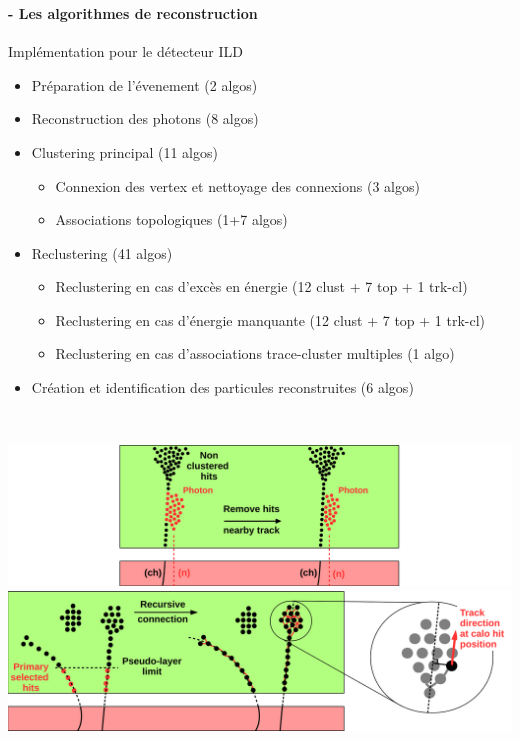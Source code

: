 \documentclass[8pt]{beamer}
\begin{document}
  \begin{frame}
  \frametitle{\secname}
  \framesubtitle{\subsecname - Les algorithmes de reconstruction}
    \begin{block}{Implémentation pour le détecteur ILD}
      \begin{itemize}
        \item<1-> Préparation de l'évenement (2 algos)
        \item<2-> Reconstruction des photons (8 algos)
        \item<3-> Clustering principal (11 algos)
        \begin{itemize}
          \item<4-> Connexion des vertex et nettoyage des connexions (3 algos)
          \item<5-> Associations topologiques (1+7 algos)
        \end{itemize}
        \item<6-> Reclustering (41 algos)
        \begin{itemize}
          \item<6-> Reclustering en cas d'excès en énergie (12 clust + 7 top + 1 trk-cl)
          \item<6-> Reclustering en cas d'énergie manquante (12 clust + 7 top + 1 trk-cl)
          \item<6-> Reclustering en cas d'associations trace-cluster multiples (1 algo)
        \end{itemize}
        \item<7-> Création et identification des particules reconstruites (6 algos)
      \end{itemize}
    \end{block}
    ~ \\
    \begin{overprint}
       \centering \includegraphics[width=0.8\linewidth]{NearbyTrackPhotonRemovalILD.pdf}
       \centering \includegraphics[width=0.8\linewidth]{TrackDrivenSeeding.pdf}

\end{overprint}
\end{frame}
\end{document}
